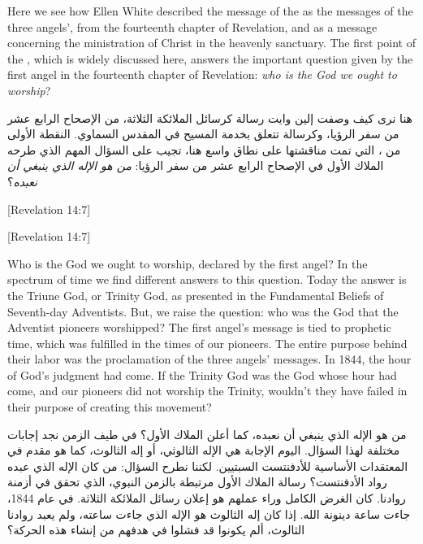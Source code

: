 Here we see how Ellen White described the message of the  as the messages of the three angels’, from the fourteenth chapter of Revelation, and as a message concerning the ministration of Christ in the heavenly sanctuary. The first point of the , which is widely discussed here, answers the important question given by the first angel in the fourteenth chapter of Revelation: \textit{who is the God we ought to worship}?


هنا نرى كيف وصفت إلين وايت رسالة  كرسائل الملائكة الثلاثة، من الإصحاح الرابع عشر من سفر الرؤيا، وكرسالة تتعلق بخدمة المسيح في المقدس السماوي. النقطة الأولى من ، التي تمت مناقشتها على نطاق واسع هنا، تجيب على السؤال المهم الذي طرحه الملاك الأول في الإصحاح الرابع عشر من سفر الرؤيا: \textit{من هو الإله الذي ينبغي أن نعبده}؟


[Revelation 14:7]


[Revelation 14:7]


Who is the God we ought to worship, declared by the first angel? In the spectrum of time we find different answers to this question. Today the answer is the Triune God, or Trinity God, as presented in the Fundamental Beliefs of Seventh-day Adventists. But, we raise the question: who was the God that the Adventist pioneers worshipped? The first angel’s message is tied to prophetic time, which was fulfilled in the times of our pioneers. The entire purpose behind their labor was the proclamation of the three angels’ messages. In 1844, the hour of God’s judgment had come. If the Trinity God was the God whose hour had come, and our pioneers did not worship the Trinity, wouldn't they have failed in their purpose of creating this movement?


من هو الإله الذي ينبغي أن نعبده، كما أعلن الملاك الأول؟ في طيف الزمن نجد إجابات مختلفة لهذا السؤال. اليوم الإجابة هي الإله الثالوثي، أو إله الثالوث، كما هو مقدم في المعتقدات الأساسية للأدفنتست السبتيين. لكننا نطرح السؤال: من كان الإله الذي عبده رواد الأدفنتست؟ رسالة الملاك الأول مرتبطة بالزمن النبوي، الذي تحقق في أزمنة روادنا. كان الغرض الكامل وراء عملهم هو إعلان رسائل الملائكة الثلاثة. في عام 1844، جاءت ساعة دينونة الله. إذا كان إله الثالوث هو الإله الذي جاءت ساعته، ولم يعبد روادنا الثالوث، ألم يكونوا قد فشلوا في هدفهم من إنشاء هذه الحركة؟


